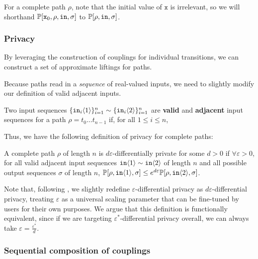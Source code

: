 For a complete path $\rho$, note that the initial value of $\texttt{x}$ is irrelevant, so we will shorthand $\mathbb{P}[\texttt{x}_0, \rho, \texttt{in}, \sigma]$ to $\mathbb{P}[\rho, \texttt{in}, \sigma]$.


\subsubsection{Privacy}

By leveraging the construction of couplings for individual transitions, we can construct a set of approximate liftings for paths.

Because paths read in a \textit{sequence} of real-valued inputs, we need to slightly modify our definition of valid adjacent inputs.

\begin{defn}
    Two input sequences $\{\texttt{in}_i\langle1 \rangle\}_{i=1}^n\sim\{\texttt{in}_i\langle2 \rangle\}_{i=1}^n$ are \textbf{valid} and \textbf{adjacent} input sequences for a path $\rho = t_0\ldots t_{n-1}$ if, for all $1\leq i\leq n$, 
\end{defn}

Thus, we have the following definition of privacy for complete paths:

\begin{defn}
    A complete path $\rho$ of length $n$ is $d\varepsilon$-differentially private for some $d>0$ if $\forall \varepsilon>0$, for all valid adjacent input sequences $\texttt{in}\langle1 \rangle\sim \texttt{in}\langle2 \rangle$ of length $n$ and all possible output sequences $\sigma$ of length $n$, $\mathbb{P}[\rho, \texttt{in}\langle1 \rangle, \sigma]\leq e^{d\varepsilon}\mathbb{P}[\rho, \texttt{in}\langle2 \rangle, \sigma]$.
\end{defn}

Note that, following \cite{chadhaLinearTimeDecidability2021}, we slightly redefine $\varepsilon$-differential privacy as $d\varepsilon$-differential privacy, treating $\varepsilon$ as a universal scaling parameter that can be fine-tuned by users for their own purposes. 
We argue that this definition is functionally equivalent, since if we are targeting $\varepsilon^*$-differential privacy overall, we can always take $\varepsilon = \frac{\varepsilon^*}{d}$.

\subsubsection{Sequential composition of couplings}

